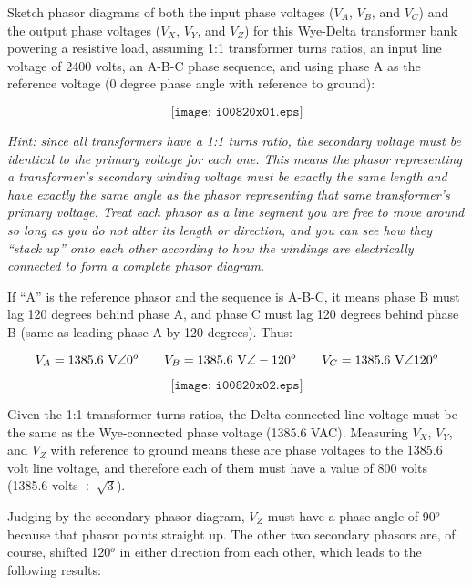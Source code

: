 

Sketch phasor diagrams of both the input phase voltages ($V_A$, $V_B$, and $V_C$) and the output phase voltages ($V_X$, $V_Y$, and $V_Z$) for this Wye-Delta transformer bank powering a resistive load, assuming 1:1 transformer turns ratios, an input line voltage of 2400 volts, an A-B-C phase sequence, and using phase A as the reference voltage (0 degree phase angle with reference to ground):

$$\texttt{[image: i00820x01.eps]}$$

{\it Hint: since all transformers have a 1:1 turns ratio, the secondary voltage must be identical to the primary voltage for each one.  This means the phasor representing a transformer's secondary winding voltage must be exactly the same length and have exactly the same angle as the phasor representing that same transformer's primary voltage.  Treat each phasor as a line segment you are free to move around so long as you do not alter its length or direction, and you can see how they ``stack up'' onto each other according to how the windings are electrically connected to form a complete phasor diagram.}







If ``A'' is the reference phasor and the sequence is A-B-C, it means phase B must lag 120 degrees behind phase A, and phase C must lag 120 degrees behind phase B (same as leading phase A by 120 degrees).  Thus:

$$V_A = 1385.6 \hbox{ V} \angle 0^o \hskip 20pt V_B = 1385.6 \hbox{ V} \angle -120^o \hskip 20pt V_C = 1385.6 \hbox{ V} \angle 120^o$$

$$\texttt{[image: i00820x02.eps]}$$

Given the 1:1 transformer turns ratios, the Delta-connected line voltage must be the same as the Wye-connected phase voltage (1385.6 VAC).  Measuring $V_X$, $V_Y$, and $V_Z$ with reference to ground means these are phase voltages to the 1385.6 volt line voltage, and therefore each of them must have a value of 800 volts (1385.6 volts $\div$ $\sqrt{3}$).

Judging by the secondary phasor diagram, $V_Z$ must have a phase angle of 90$^{o}$ because that phasor points straight up.  The other two secondary phasors are, of course, shifted 120$^{o}$ in either direction from each other, which leads to the following results:

